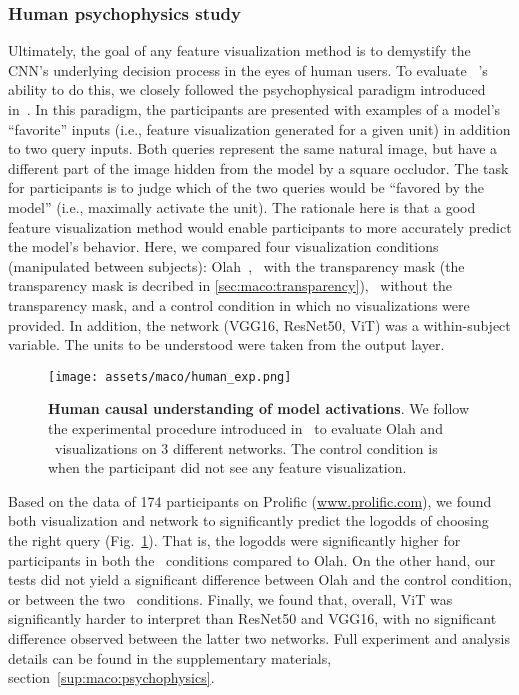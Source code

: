 \subsubsection{Human psychophysics study}
Ultimately, the goal of any feature visualization method is to demystify the CNN's underlying decision process in the eyes of human users. To evaluate \magfv~'s ability to do this, we closely followed the psychophysical paradigm introduced in~\cite{zimmermann2021well}. In this paradigm, the participants are presented with examples of a model's ``favorite'' inputs (i.e., feature visualization generated for a given unit) in addition to two query inputs. Both queries represent the same natural image, but have a different part of the image hidden from the model by a square occludor. The task for participants is to judge which of the two queries would be ``favored by the model'' (i.e., maximally activate the unit). The rationale here is that a good feature visualization method would enable participants to more accurately predict the model's behavior. Here, we compared four visualization conditions (manipulated between subjects): Olah~\cite{olah2017feature}, \magfv~with the transparency mask (the transparency mask is decribed in \ref{sec:maco:transparency}), \magfv~without the transparency mask, and a control condition in which no visualizations were provided. In addition, the network (VGG16, ResNet50, ViT) was a within-subject variable. The units to be understood were taken from the output layer.

\begin{figure}[ht]
\texttt{[image: assets/maco/human\_exp.png]}
\caption{\textbf{Human causal understanding of model activations}. We follow the experimental procedure introduced in~\cite{zimmermann2021well} to evaluate Olah and \magfv~visualizations on $3$ different networks. The control condition is when the participant did not see any feature visualization. 
}
\label{fig:maco:human_results}    
\end{figure}

Based on the data of 174 participants on Prolific (\url{www.prolific.com}), we found both visualization and network to significantly predict the logodds of choosing the right query (Fig.~\ref{fig:maco:human_results}). That is, the logodds were significantly higher for participants in both the \magfv~conditions compared to Olah. On the other hand, our tests did not yield a significant difference between Olah and the control condition, or between the two \magfv~conditions. Finally, we found that, overall, ViT was significantly harder to interpret than ResNet50 and VGG16, with no significant difference observed between the latter two networks. Full experiment and analysis details can be found in the supplementary materials, section~\ref{sup:maco:psychophysics}. 

